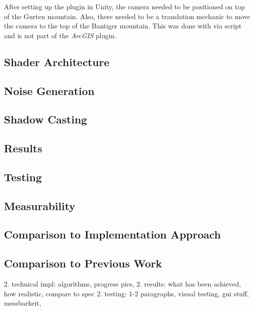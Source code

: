 \noindent
After setting up the plugin in Unity, the camera needed to be positioned on top of the Gurten mountain. Also, there needed to be a translation mechanic to move the camera to the top of the Bantiger mountain.
This was done with via script and is not part of the \emph{ArcGIS} plugin.

\subsection{Shader Architecture}
\label{section:techimpl:architecture}

\subsection{Noise Generation}
\label{section:techimpl:architecture}

\subsection{Shadow Casting}
\label{section:techimpl:architecture}

\subsection{Results}
\label{section:techimpl:results}

\subsection{Testing}
\label{section:techimpl:testing}

\subsection{Measurability}
\label{section:techimpl:measure}

\subsection{Comparison to Implementation Approach}
\label{section:techimpl:comparison_impl}

\subsection{Comparison to Previous Work}
\label{section:techimpl:comparison}

2. technical impl: algorithms, progress pics, 
2. results: what has been achieved, how realistic, compare to spec
2. testing: 1-2 paragraphs, visual testing, gui stuff, messbarkeit,
